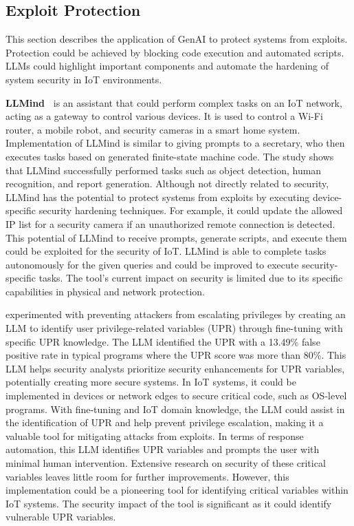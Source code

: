 \subsection{Exploit Protection}
%
This section describes the application of GenAI to protect systems from exploits.
Protection could be achieved by blocking code execution and automated scripts.
LLMs could highlight important components and automate the hardening of system security in IoT environments.

\smallskip
\noindent \textbf{LLMind~\citet{cui2024llmind}} is an assistant that could perform complex tasks on an IoT network, acting as a gateway to control various devices.
It is used to control a Wi-Fi router, a mobile robot, and security cameras in a smart home system.
Implementation of LLMind is similar to giving prompts to a secretary, who then executes tasks based on generated finite-state machine code.
The study shows that LLMind successfully performed tasks such as object detection, human recognition, and report generation.
Although not directly related to security, LLMind has the potential to protect systems from exploits by executing device-specific security hardening techniques.
For example, it could update the allowed IP list for a security camera if an unauthorized remote connection is detected.
This potential of LLMind to receive prompts, generate scripts, and execute them could be exploited for the security of IoT.
LLMind is able to complete tasks autonomously for the given queries and could be improved to execute security-specific tasks.
The tool's current impact on security is limited due to its specific capabilities in physical and network protection.

\smallskip
\noindent \textbf{\citet{wang2024hybrid}} experimented with preventing attackers from escalating privileges by creating an LLM to identify user privilege-related variables (UPR) through fine-tuning with specific UPR knowledge.
The LLM identified the UPR with a 13.49\% false positive rate in typical programs where the UPR score was more than 80\%.
This LLM helps security analysts prioritize security enhancements for UPR variables, potentially creating more secure systems.
In IoT systems, it could be implemented in devices or network edges to secure critical code, such as OS-level programs.
With fine-tuning and IoT domain knowledge, the LLM could assist in the identification of UPR and help prevent privilege escalation, making it a valuable tool for mitigating attacks from exploits.
In terms of response automation, this LLM identifies UPR variables and prompts the user with minimal human intervention.
Extensive research on security of these critical variables leaves little room for further improvements.
However, this implementation could be a pioneering tool for identifying critical variables within IoT systems.
The security impact of the tool is significant as it could identify vulnerable UPR variables.

